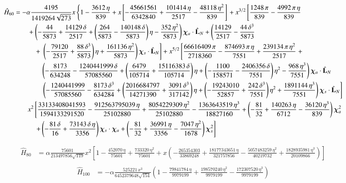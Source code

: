 \documentclass[prd,preprintnumbers,twocolumn,eqsecnum,floatfix,letter]{revtex4}
\begin{document}
\begin{widetext}
\begin{align}\label{eq:H60}
	\hat{H}_{60} &=-\alpha\frac{4195}{1419264\sqrt{273}}x\left\{1-\frac{3612\,\eta}{839}+ x\left[-\frac{45661561}{6342840} + \frac{101414\,\eta}{2517} - \frac{48118\,\eta^2}{839}\right]\right. + x^{3/2} \left[\frac{1248\,\pi}{839} -\frac{4992\,\pi\,\eta}{839}\right.\nonumber\\
	&\qquad + \left(-\frac{44}{5873} + \frac{14129\,\delta}{2517} + \left(\frac{264}{5873} - \frac{140148\,\delta}{5873}\right)\eta -\frac{352\,\eta^2}{5873}\right)\bm{\chi}_a \cdot \hat{\mathbf{L}}_N + \left(\frac{14129}{2517} -\frac{44\,\delta^3}{5873}\right.\nonumber\\
	&\quad\qquad + \left.\left.\left(-\frac{79120}{2517} + \frac{88\,\delta^3}{5873}\right)\eta + \frac{161136\,\eta^2}{5873}\right)\bm{\chi}_s \cdot \hat{\mathbf{L}}_N\right] + x^{5/2}\left[\frac{66616409\,\pi}{2718360} -\frac{874693\,\pi\,\eta}{7551} + \frac{239134\,\pi\,\eta^2}{2517}\right. + \nonumber\\
	&\qquad\qquad \left(-\frac{8173}{634248} -\frac{1240441999\,\delta}{57085560} + \left(\frac{6479}{105714} + \frac{15116383\,\delta}{105714}\right)\eta + \left(-\frac{1100}{158571}-\frac{2406356\,\delta}{7551}\right)\eta^2-\frac{968\,\eta^3}{7551}\right)\bm{\chi}_a \cdot \hat{\mathbf{L}}_N\nonumber\\
	&\qquad\qquad \left. \left(-\frac{1240441999}{57085560} -\frac{8173\,\delta^3}{634284} + \left(\frac{2016684797}{14271390} + \frac{3091\,\delta^3}{317142}\right)\eta + \left(-\frac{19243010}{52857} + \frac{242\,\delta^3}{7551}\right)\eta^2 + \frac{1891144\,\eta^3}{7551}\right)\bm{\chi}_s \cdot \hat{\mathbf{L}}_N\right]\nonumber\\
	&\qquad x^2\left[\frac{33133408041593}{1594133291520}-\frac{912563795039\,\eta}{25102880} + \frac{8054229309\,\eta^2}{25102880}-\frac{1363643519\,\eta^3}{18827160} + \left(-\frac{81}{32} + \frac{140263\,\eta}{6712}-\frac{36120\,\eta^3}{839}\right)\bm{\chi}_a^2\right. \nonumber\\
	& \quad\qquad \left.+ \left(-\frac{81\,\delta}{16} + \frac{73143\,\delta\,\eta}{3356}\right)\bm{\chi}_s \cdot \bm{\chi}_a + \left(-\frac{81}{32} + \frac{36991\,\eta}{3356} - \frac{7047\,\eta^2}{1678}\right)\bm{\chi}_s^2\right]
\end{align}

\begin{align}\label{eq:H80}
	\hat{H}_{80} &=\alpha\frac{75601}{213497856\sqrt{119}}x^2\left[1-\frac{452070\,\eta}{75601} + \frac{733320\,\eta^2}{75601} + x\left(-\frac{265354303}{33869248} + \frac{18177343651\,\eta}{321757856} - \frac{5057483259\,\eta^2}{40219732} + \frac{1828935981\,\eta^3}{20109866}\right)\right]\nonumber\\	
\end{align}
\begin{align}\label{eq:H80}
\hat{H}_{100} &=-\alpha\frac{525221\,x^3}{6452379648\sqrt{154}}\left(1 - \frac{79841784\,\eta}{9979199} + \frac{198570240\,\eta^2}{9979199} -\frac{172307520\,\eta^3}{9979199}\right)
\end{align}
\end{widetext}
\end{document}
